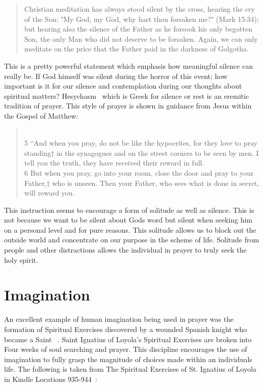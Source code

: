 \documentclass[11pt,a4paper]{scrartcl} %
\begin{document}
\begin{quotation}
Christian meditation has always stood silent by the cross, hearing the cry of the Son: "My God, my God, why hast thou forsaken me?" (Mark 15:34); but hearing also the silence of the Father as he forsook his only begotten Son, the only Man who did not deserve to be forsaken. Again, we can only meditate on the price that the Father paid in the darkness of Golgotha.
\end{quotation}
\begin{doublespace}
This is a pretty powerful statement which emphasis how meaningful silence can really be. If God himself was silent during the horror of this event; how important is it for our silence and contemplation during our thoughts about spiritual matters? Hesychasm~\cite{wiki:004} which is Greek for silence or rest is an eremitic tradition of prayer. This style of prayer is shown in guidance from Jesus within the Gospel of Matthew:
\end{doublespace}
\begin{verse}
\textcolor{Maroon}{}\\
5 “And when you pray, do not be like the hypocrites, for they love to pray standing† in the synagogues and on the street corners to be seen by men. I tell you the truth, they have received their reward in full.\\
6 But when you pray, go into your room, close the door and pray to your Father,† who is unseen. Then your Father, who sees what is done in secret, will reward you. 
\end{verse}
\begin{doublespace}
This instruction seems to encourage a form of solitude as well as silence. This is not because we want to be silent about Gods word but silent when seeking him on a personal level and for pure reasons. This solitude allows us to block out the outside world and concentrate on our purpose in the scheme of life.  Solitude from people and other distractions allows the individual in prayer to truly seek the holy spirit. 
\section{Imagination}
An excellent example of human imagination being used in prayer was the formation of Spiritual Exercises discovered by a wounded Spanish knight who became a Saint~\cite{wiki:005} . Saint Ignatius of Loyola's Spiritual Exercises are broken into Four weeks of soul searching and prayer. This discipline encourages the use of imagination to fully grasp the magnitude of choices made within an individuals life. The following is taken from The Spiritual Exercises of St. Ignatius of Loyola in Kindle Locations 935-944~\cite{Ignatius}:
\end{doublespace}
\end{document}
